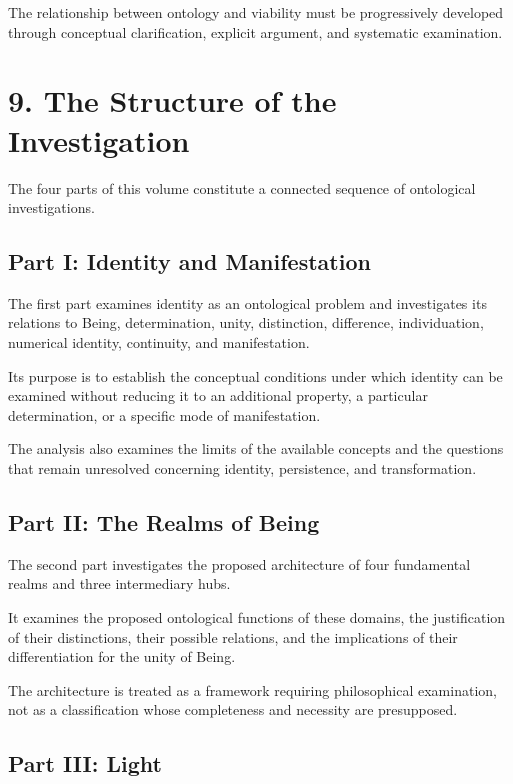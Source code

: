 The relationship between ontology and viability
must be progressively developed through conceptual
clarification, explicit argument, and systematic
examination.


\section*{9. The Structure of the Investigation}

The four parts of this volume constitute a connected
sequence of ontological investigations.

\subsection*{Part I: Identity and Manifestation}

The first part examines identity as an ontological
problem and investigates its relations to Being,
determination, unity, distinction, difference,
individuation, numerical identity, continuity,
and manifestation.

Its purpose is to establish the conceptual
conditions under which identity can be examined
without reducing it to an additional property,
a particular determination, or a specific mode
of manifestation.

The analysis also examines the limits of the
available concepts and the questions that remain
unresolved concerning identity, persistence,
and transformation.

\subsection*{Part II: The Realms of Being}

The second part investigates the proposed
architecture of four fundamental realms and
three intermediary hubs.

It examines the proposed ontological functions
of these domains, the justification of their
distinctions, their possible relations, and the
implications of their differentiation for the
unity of Being.

The architecture is treated as a framework
requiring philosophical examination, not as
a classification whose completeness and necessity
are presupposed.

\subsection*{Part III: Light}

